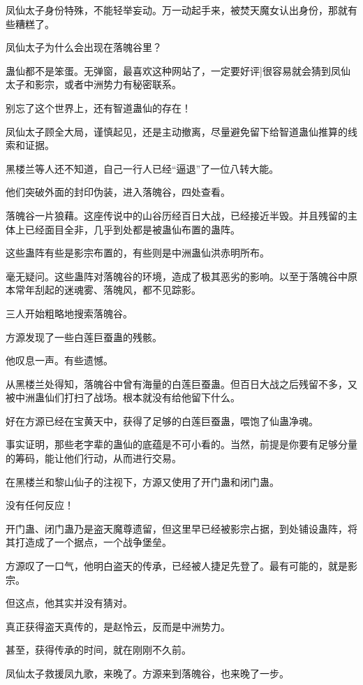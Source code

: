 \begin{this_body}
凤仙太子身份特殊，不能轻举妄动。万一动起手来，被焚天魔女认出身份，那就有些糟糕了。

凤仙太子为什么会出现在落魄谷里？

蛊仙都不是笨蛋。无弹窗，最喜欢这种网站了，一定要好评]很容易就会猜到凤仙太子和影宗，或者中洲势力有秘密联系。

别忘了这个世界上，还有智道蛊仙的存在！

凤仙太子顾全大局，谨慎起见，还是主动撤离，尽量避免留下给智道蛊仙推算的线索和证据。

黑楼兰等人还不知道，自己一行人已经“逼退”了一位八转大能。

他们突破外面的封印伪装，进入落魄谷，四处查看。

落魄谷一片狼藉。这座传说中的山谷历经百日大战，已经接近半毁。并且残留的主体上已经面目全非，几乎到处都是被蛊仙布置的蛊阵。

这些蛊阵有些是影宗布置的，有些则是中洲蛊仙洪赤明所布。

毫无疑问。这些蛊阵对落魄谷的环境，造成了极其恶劣的影响。以至于落魄谷中原本常年刮起的迷魂雾、落魄风，都不见踪影。

三人开始粗略地搜索落魄谷。

方源发现了一些白莲巨蚕蛊的残骸。

他叹息一声。有些遗憾。

从黑楼兰处得知，落魄谷中曾有海量的白莲巨蚕蛊。但百日大战之后残留不多，又被中洲蛊仙们打扫了战场。根本就没有给他留下什么。

好在方源已经在宝黄天中，获得了足够的白莲巨蚕蛊，喂饱了仙蛊净魂。

事实证明，那些老字辈的蛊仙的底蕴是不可小看的。当然，前提是你要有足够分量的筹码，能让他们行动，从而进行交易。

在黑楼兰和黎山仙子的注视下，方源又使用了开门蛊和闭门蛊。

没有任何反应！

开门蛊、闭门蛊乃是盗天魔尊遗留，但这里早已经被影宗占据，到处铺设蛊阵，将其打造成了一个据点，一个战争堡垒。

方源叹了一口气，他明白盗天的传承，已经被人捷足先登了。最有可能的，就是影宗。

但这点，他其实并没有猜对。

真正获得盗天真传的，是赵怜云，反而是中洲势力。

甚至，获得传承的时间，就在刚刚不久前。

凤仙太子救援凤九歌，来晚了。方源来到落魄谷，也来晚了一步。


\end{this_body}
